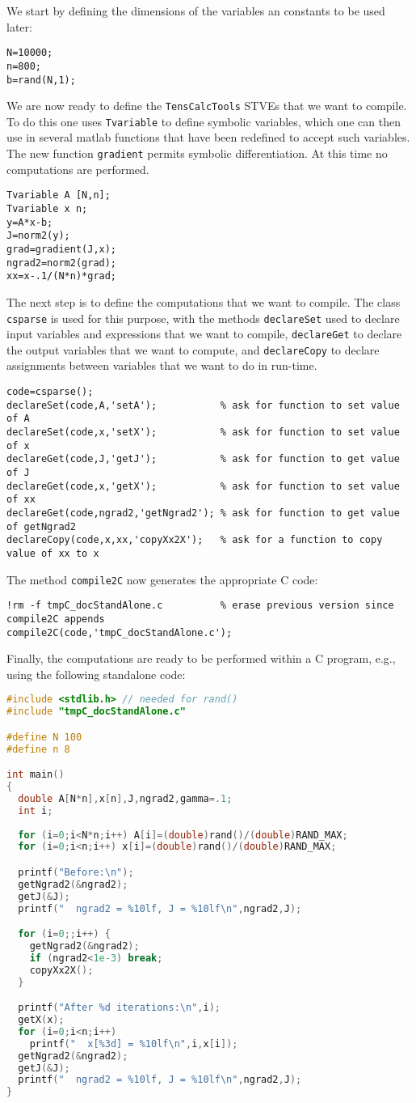 \documentclass[11pt]{article}
\newcommand{\TC}{\texttt{TensCalcTools}}
\begin{document}
We start by defining the dimensions of the variables an constants to
be used later:
\begin{lstlisting}
N=10000;
n=800;
b=rand(N,1);
\end{lstlisting}
We are now ready to define the \TC{} STVEs that we want to compile. To
do this one uses \lstinline{Tvariable} to define symbolic variables,
which one can then use in several matlab functions that have been
redefined to accept such variables. The new function
\lstinline{gradient} permits symbolic differentiation. At this time no
computations are performed.
\begin{lstlisting}
Tvariable A [N,n];
Tvariable x n;
y=A*x-b;
J=norm2(y);
grad=gradient(J,x);
ngrad2=norm2(grad);
xx=x-.1/(N*n)*grad;
\end{lstlisting}
The next step is to define the computations that we want to
compile. The class \lstinline{csparse} is used for this purpose, with
the methods \lstinline{declareSet} used to declare input variables and
expressions that we want to compile, \lstinline{declareGet} to declare
the output variables that we want to compute, and
\lstinline{declareCopy} to declare assignments between variables that
we want to do in run-time. 
\begin{lstlisting}
code=csparse();
declareSet(code,A,'setA');           % ask for function to set value of A
declareSet(code,x,'setX');           % ask for function to set value of x
declareGet(code,J,'getJ');           % ask for function to get value of J
declareGet(code,x,'getX');           % ask for function to set value of xx
declareGet(code,ngrad2,'getNgrad2'); % ask for function to get value of getNgrad2
declareCopy(code,x,xx,'copyXx2X');   % ask for a function to copy value of xx to x
\end{lstlisting}
The method \lstinline{compile2C} now generates the appropriate C code:
\begin{lstlisting}
!rm -f tmpC_docStandAlone.c          % erase previous version since compile2C appends
compile2C(code,'tmpC_docStandAlone.c');
\end{lstlisting}
Finally, the computations are ready to be performed within a C
program, e.g., using the following standalone code:
\begin{lstlisting}[language=C]
#include <stdlib.h> // needed for rand()
#include "tmpC_docStandAlone.c"

#define N 100
#define n 8

int main()
{
  double A[N*n],x[n],J,ngrad2,gamma=.1;
  int i;
  
  for (i=0;i<N*n;i++) A[i]=(double)rand()/(double)RAND_MAX;
  for (i=0;i<n;i++) x[i]=(double)rand()/(double)RAND_MAX;

  printf("Before:\n");
  getNgrad2(&ngrad2);   
  getJ(&J);             
  printf("  ngrad2 = %10lf, J = %10lf\n",ngrad2,J);

  for (i=0;;i++) {
    getNgrad2(&ngrad2);
    if (ngrad2<1e-3) break;
    copyXx2X();
  } 

  printf("After %d iterations:\n",i);
  getX(x); 
  for (i=0;i<n;i++) 
    printf("  x[%3d] = %10lf\n",i,x[i]);
  getNgrad2(&ngrad2);   
  getJ(&J);             
  printf("  ngrad2 = %10lf, J = %10lf\n",ngrad2,J);
}
\end{lstlisting}
\end{document}

